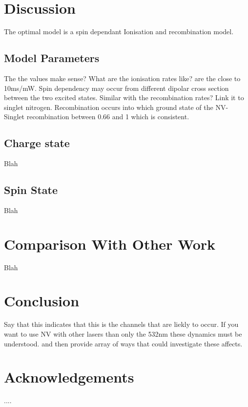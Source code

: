 \documentclass[,prl,twocolumn]{revtex4}
\begin{document}
\section{Discussion}
The optimal model is a spin dependant Ionisation and recombination model.

\subsection{Model Parameters}
The the values make sense?
What are the ionisation rates like? are the close to 10ms/mW. Spin dependency may occur from different dipolar cross section between the two excited states.
Similar with the recombination rates? Link it to singlet nitrogen.
Recombination occurs into which ground state of the NV- 
Singlet recombination between 0.66 and 1 which is consistent.


\subsection{Charge state}
Blah
\subsection{Spin State}
Blah

\section{Comparison With Other Work}
Blah

\section{Conclusion}
Say that this indicates that this is the channels that are liekly to occur. If you want to use NV with other lasers than only the 532nm these dynamics must be understood. and then provide array of ways that could investigate these affects.
    


\section*{Acknowledgements}

....

%
%
%




\begin{thebibliography}{27}






\end{thebibliography}
\end{document}
